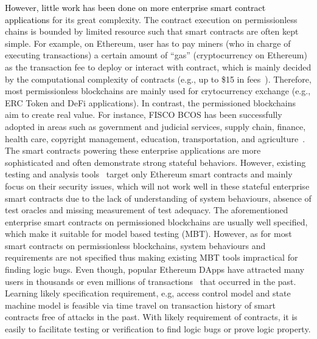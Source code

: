 \textcolor{black}{However, little work has been done on more enterprise smart contract applications} for its great complexity.
The contract execution on permissionless chains is bounded by limited resource such that smart contracts are often kept simple.
For example, on Ethereum, user has to pay miners (who in charge of executing transactions) a certain amount of ``gas'' (cryptocurrency on Ethereum) as the transaction fee to deploy or interact with contract, which is mainly decided by the computational complexity of contracts (e.g., up to \$15 in fees~\cite{gas-fee}).
Therefore, most permissionless blockchains are mainly used for crytocurrency exchange (e.g., ERC Token and DeFi applications).
In contrast, the permissioned blockchains aim to create real value.
For instance, FISCO BCOS has been successfully adopted in areas such as government and judicial services, supply chain, finance, health care, copyright management, education, transportation, and agriculture~\cite{fisco}.
The smart contracts powering these enterprise applications are more sophisticated and often demonstrate strong stateful behaviors.
However, existing testing and analysis tools~\cite{jiang2018contractfuzzer,oyente,securify,SmartCheck,wang2019vultron} target only Ethereum smart contracts and mainly focus on their security issues, which will not work well in these stateful enterprise smart contracts due to the lack of understanding of system behaviours, absence of test oracles and missing measurement of test adequacy.
The aforementioned enterprise smart contracts on permissioned blockchains are usually well specified, which make it suitable for model based testing (MBT).
However, as for most smart contracts on permissionless blockchains, system behaviours and requirements are not specified thus making existing MBT tools impractical for finding logic bugs.
Even though, popular Ethereum DApps have attracted many users in thousands or even millions of transactions~\cite{Etherscan} that occurred in the past.
Learning likely specification requirement, e.g, access control model and state machine model is feasible via time travel on transaction history of smart contracts free of attacks in the past.
With likely requirement of contracts, it is easily to facilitate testing or verification to find logic bugs or prove logic property.
 
